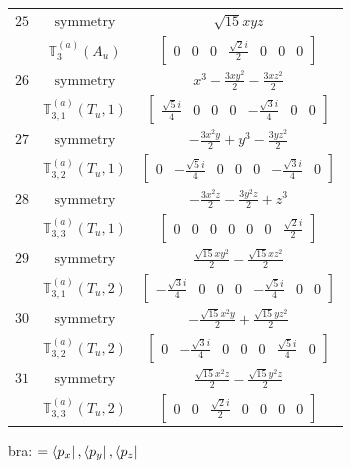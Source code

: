 \documentclass[fleqn,8pt,landscape]{jsarticle}
\begin{document}
\begin{longtable}{ccc}
$ 25 $ & $ \text{symmetry} $ & $ \sqrt{15} x y z $ \\
$  $ & $ \mathbb{T}_{3}^{(a)}(A_{u}) $ & $ \begin{bmatrix} 0 & 0 & 0 & \frac{\sqrt{2} i}{2} & 0 & 0 & 0 \end{bmatrix} $ \\ \hline
$ 26 $ & $ \text{symmetry} $ & $ x^{3} - \frac{3 x y^{2}}{2} - \frac{3 x z^{2}}{2} $ \\
$  $ & $ \mathbb{T}_{3,1}^{(a)}(T_{u},1) $ & $ \begin{bmatrix} \frac{\sqrt{5} i}{4} & 0 & 0 & 0 & - \frac{\sqrt{3} i}{4} & 0 & 0 \end{bmatrix} $ \\ \hline
$ 27 $ & $ \text{symmetry} $ & $ - \frac{3 x^{2} y}{2} + y^{3} - \frac{3 y z^{2}}{2} $ \\
$  $ & $ \mathbb{T}_{3,2}^{(a)}(T_{u},1) $ & $ \begin{bmatrix} 0 & - \frac{\sqrt{5} i}{4} & 0 & 0 & 0 & - \frac{\sqrt{3} i}{4} & 0 \end{bmatrix} $ \\ \hline
$ 28 $ & $ \text{symmetry} $ & $ - \frac{3 x^{2} z}{2} - \frac{3 y^{2} z}{2} + z^{3} $ \\
$  $ & $ \mathbb{T}_{3,3}^{(a)}(T_{u},1) $ & $ \begin{bmatrix} 0 & 0 & 0 & 0 & 0 & 0 & \frac{\sqrt{2} i}{2} \end{bmatrix} $ \\ \hline
$ 29 $ & $ \text{symmetry} $ & $ \frac{\sqrt{15} x y^{2}}{2} - \frac{\sqrt{15} x z^{2}}{2} $ \\
$  $ & $ \mathbb{T}_{3,1}^{(a)}(T_{u},2) $ & $ \begin{bmatrix} - \frac{\sqrt{3} i}{4} & 0 & 0 & 0 & - \frac{\sqrt{5} i}{4} & 0 & 0 \end{bmatrix} $ \\ \hline
$ 30 $ & $ \text{symmetry} $ & $ - \frac{\sqrt{15} x^{2} y}{2} + \frac{\sqrt{15} y z^{2}}{2} $ \\
$  $ & $ \mathbb{T}_{3,2}^{(a)}(T_{u},2) $ & $ \begin{bmatrix} 0 & - \frac{\sqrt{3} i}{4} & 0 & 0 & 0 & \frac{\sqrt{5} i}{4} & 0 \end{bmatrix} $ \\ \hline
$ 31 $ & $ \text{symmetry} $ & $ \frac{\sqrt{15} x^{2} z}{2} - \frac{\sqrt{15} y^{2} z}{2} $ \\
$  $ & $ \mathbb{T}_{3,3}^{(a)}(T_{u},2) $ & $ \begin{bmatrix} 0 & 0 & \frac{\sqrt{2} i}{2} & 0 & 0 & 0 & 0 \end{bmatrix} $ \\ \hline
\end{longtable}
bra: $=\bra{p_{x}}, \bra{p_{y}}, \bra{p_{z}}$
\end{document}
